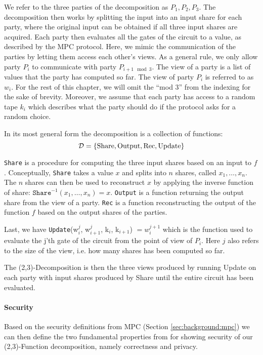 We refer to the three parties of the decomposition as $P_{1}, P_{2}, P_{3}$. The
decomposition then works by splitting the input into an input share for each
party, where the original input can be obtained if all three input shares are
acquired.
Each party then evaluates all the gates of the circuit to a value, as described by
the MPC protocol. Here, we mimic the communication of the parties by letting
them access each other's views. As a general rule, we only allow party $P_{i}$ to
communicate with party $P_{i+1 \mod 3}$.
The view of a party is a list of values that the party has computed so far.
The view of party $P_{i}$ is referred to as $w_{i}$.
For the rest of this chapter, we will omit the ``mod 3'' from the
indexing for the sake of brevity.
Moreover, we assume that each party has access to a random tape $k_{i}$
which describes what the party should do if the protocol asks for a random
choice.

\begin{definition}
  In its most general form the decomposition is a collection of functions:
  \[
    \mathcal{D} = \{\text{Share}, \text{Output}, \text{Rec}, \text{Update}\}
  \]

  \texttt{Share} is a procedure for computing the three input shares based on an
  input to $f$. Conceptually, \texttt{Share} takes a value $x$ and splits into
  $n$ shares, called $x_{1}, \dots, x_{n}$. The $n$ shares can then be used to
  reconstruct $x$ by applying the inverse function of share:
  $\texttt{Share}^{-1}(x_{1}, \dots , x_{n}) = x$.
  \texttt{Output} is a function returning the output share from the view of a party.
  \texttt{Rec} is a function reconstructing the output of the function $f$ based on the
  output shares of the parties.

  Last, we have \texttt{Update}(w$^{j}_{i}$, w$^{j}_{i+1}$, k$_{i}$, k$_{i+1}$) $= w^{j+1}_{i}$ which
  is the function used to evaluate the j'th gate of the circuit from the point
  of view of $P_{i}$. Here
  $j$ also refers to the size of the view, i.e. how many shares has been
  computed so far.
\end{definition}

The (2,3)-Decomposition is then the three views produced by running Update on
each party with input shares produced by Share until the entire circuit has been
evaluated.

\paragraph{Security}
Based on the security definitions from MPC (Section \ref{sec:background:mpc}) we
can then define the two fundamental properties from \cite{zkboo} for showing security of
our (2,3)-Function decomposition, namely correctness and privacy.


